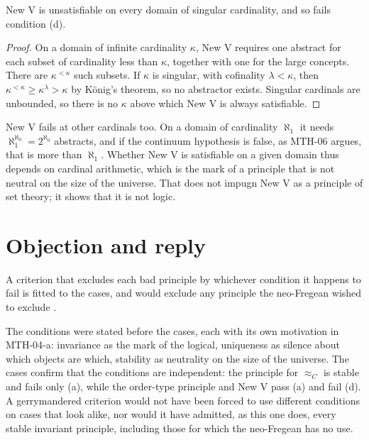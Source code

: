\documentclass{situationist-preprint}
\begin{document}
\begin{proposition}\label{p:newv}
New V is unsatisfiable on every domain of singular cardinality, and so fails condition (d).
\end{proposition}

\begin{proof}
On a domain of infinite cardinality $\kappa$, New V requires one abstract for each subset of cardinality less than $\kappa$, together with one for the large concepts. There are $\kappa^{<\kappa}$ such subsets. If $\kappa$ is singular, with cofinality $\lambda < \kappa$, then $\kappa^{<\kappa} \geq \kappa^\lambda > \kappa$ by K\"onig's theorem, so no abstractor exists. Singular cardinals are unbounded, so there is no $\kappa$ above which New V is always satisfiable.
\end{proof}

New V fails at other cardinals too. On a domain of cardinality $\aleph_1$ it needs $\aleph_1^{\aleph_0} = 2^{\aleph_0}$ abstracts, and if the continuum hypothesis is false, as MTH-06 argues, that is more than $\aleph_1$. Whether New V is satisfiable on a given domain thus depends on cardinal arithmetic, which is the mark of a principle that is not neutral on the size of the universe. That does not impugn New V as a principle of set theory; it shows that it is not logic.

\section{Objection and reply}\label{s:obj}

\begin{objection}[Gerrymandering]
A criterion that excludes each bad principle by whichever condition it happens to fail is fitted to the cases, and would exclude any principle the neo-Fregean wished to exclude \citep{Fine2002,Linnebo2018}.
\end{objection}

\begin{reply}
The conditions were stated before the cases, each with its own motivation in MTH-04-a: invariance as the mark of the logical, uniqueness as silence about which objects are which, stability as neutrality on the size of the universe. The cases confirm that the conditions are independent: the principle for $\approx_C$ is stable and fails only (a), while the order-type principle and New V pass (a) and fail (d). A gerrymandered criterion would not have been forced to use different conditions on cases that look alike, nor would it have admitted, as this one does, every stable invariant principle, including those for which the neo-Fregean has no use.
\end{reply}
\end{document}
